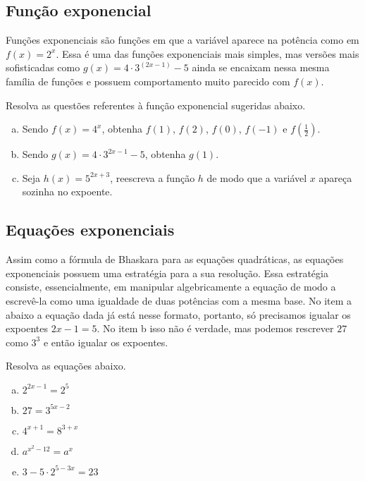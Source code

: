 \documentclass[main_estudante.tex]{subfiles}
\begin{document}
\subsection*{Função exponencial}

Funções exponenciais são funções em que a variável aparece na potência como em $f(x)=2^x$. Essa é uma das funções exponenciais mais simples, mas versões mais sofisticadas como $g(x)=4 \cdot 3^(2x-1)-5$ ainda se encaixam nessa mesma família de funções e possuem comportamento muito parecido com $f(x)$.

\begin{questao}
Resolva as questões referentes à função exponencial sugeridas abaixo.
\begin{enumerate}[a)]
\item Sendo $f(x)=4^x$, obtenha $f(1)$, $f(2)$, $f(0)$, $f(-1)$ e $f(\frac{1}{2})$.
\item Sendo $g(x)=4 \cdot 3^{2x-1}-5$, obtenha $g(1)$.
\item Seja $h(x)=5^{2x+3}$, reescreva a função $h$ de modo que a variável $x$ apareça sozinha no expoente.
\end{enumerate}
\end{questao}

\subsection*{Equações exponenciais}

Assim como a fórmula de Bhaskara para as equações quadráticas, as equações exponenciais possuem uma estratégia para a sua resolução. Essa estratégia consiste, essencialmente, em manipular algebricamente a equação de modo a escrevê-la como uma igualdade de duas potências com a mesma base. No item a abaixo a equação dada já está nesse formato, portanto, só precisamos igualar os expoentes $2x-1=5$. No item b isso não é verdade, mas podemos rescrever $27$ como $3^3$ e então igualar os expoentes.

\begin{questao}
Resolva as equações abaixo.
\begin{enumerate}[a)]
\item $2^{2x-1} = 2^5$
\item $27 = 3^{5x-2}$
\item $4^{x+1}=8^{3+x}$
\item $a^{x^2-12}=a^{x}$
\item $3-5 \cdot 2^{5-3x} = 23$
\end{enumerate}
\end{questao}
\end{document}
